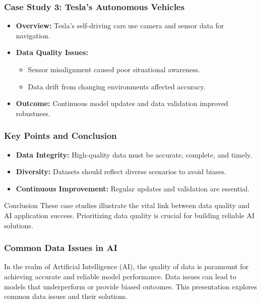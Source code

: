 \documentclass[aspectratio=169]{beamer}
\begin{document}
\begin{frame}[fragile]
    \frametitle{Case Study 3: Tesla's Autonomous Vehicles}
    \begin{itemize}
        \item \textbf{Overview:} 
        Tesla's self-driving cars use camera and sensor data for navigation.
        
        \item \textbf{Data Quality Issues:}
        \begin{itemize}
            \item Sensor misalignment caused poor situational awareness.
            \item Data drift from changing environments affected accuracy.
        \end{itemize}
        
        \item \textbf{Outcome:} 
        Continuous model updates and data validation improved robustness.
    \end{itemize}
\end{frame}

\begin{frame}[fragile]
    \frametitle{Key Points and Conclusion}
    \begin{itemize}
        \item \textbf{Data Integrity:} High-quality data must be accurate, complete, and timely.
        \item \textbf{Diversity:} Datasets should reflect diverse scenarios to avoid biases.
        \item \textbf{Continuous Improvement:} Regular updates and validation are essential.
    \end{itemize}
    \begin{block}{Conclusion}
        These case studies illustrate the vital link between data quality and AI application success. Prioritizing data quality is crucial for building reliable AI solutions.
    \end{block}
\end{frame}

\begin{frame}[fragile]
    \frametitle{Common Data Issues in AI}
    In the realm of Artificial Intelligence (AI), the quality of data is paramount for achieving accurate and reliable model performance. 
    Data issues can lead to models that underperform or provide biased outcomes. This presentation explores common data issues and their solutions.
\end{frame}
\end{document}
